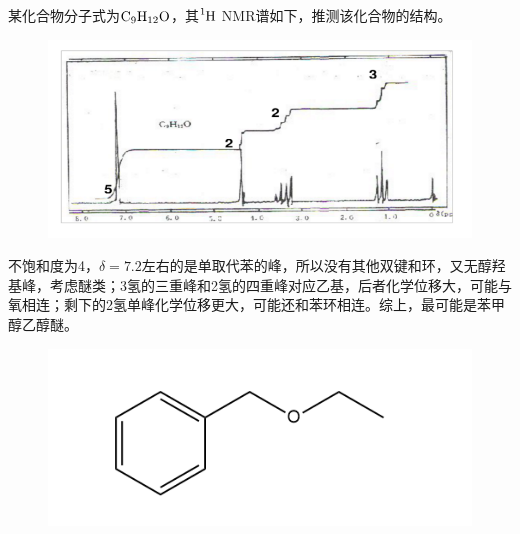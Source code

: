 \begin{example}
	某化合物分子式为$\ce{C9H12O}$，其$\ce{^{1}H}$ NMR谱如下，推测该化合物的结构。
	
	\begin{figure}[!h]
		\centering
		\includegraphics[width=0.9\linewidth]{image/chp6_example1}
		\label{fig:chp6example1}
	\end{figure}

	\solve
	不饱和度为4，$\delta=7.2$左右的是单取代苯的峰，所以没有其他双键和环，又无醇羟基峰，考虑醚类；3氢的三重峰和2氢的四重峰对应乙基，后者化学位移大，可能与氧相连；剩下的2氢单峰化学位移更大，可能还和苯环相连。综上，最可能是苯甲醇乙醇醚。
	\begin{figure}[!h]
		\centering
		\includegraphics[width=0.6\linewidth]{image/chp6_answer1}
		\label{fig:chp6answer1}
	\end{figure}
\end{example}


